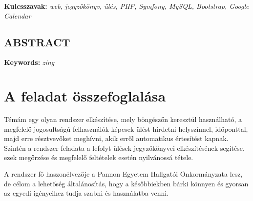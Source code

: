 \documentclass[a4paper,12pt,oneside]{report}
\begin{document}


\vspace{2cm}

{\bf Kulcsszavak:} {\it web, jegyzőkönyv, ülés, PHP, Symfony, MySQL, Bootstrap, Google Calendar }
\newpage

\newpage

\begin{center}
\section*{\textbf{\Large \MakeUppercase{Abstract}}}
\end{center}


\vspace{2cm}

{\bf Keywords:} {\it zing }
\newpage
\listoftodos

\renewcommand{\thefigure}{\arabic{figure}}

\setcounter{tocdepth}{3} %
\thispagestyle{empty}
\tableofcontents
\pagebreak

\setcounter{page}{1} %
\pagestyle{plain}
\fancyhead[C]{\rightmark}
\fancyfoot[R]{\thepage}

\section{A feladat összefoglalása}

Témám egy olyan rendszer elkészítése, mely böngészőn keresztül használható, a megfelelő jogosultságú felhasználók képesek ülést hirdetni helyszínnel, időponttal, majd erre résztvevőket meghívni, akik erről automatikus értesítést kapnak. Szintén a rendszer feladata a lefolyt ülések jegyzőkönyvei elkészítésének segítése, ezek megőrzése és megfelelő feltételek esetén nyilvánossá tétele.

A rendszer fő haszonélvezője a Pannon Egyetem Hallgatói Önkormányzata lesz, de célom a lehetőség általánosítás, hogy a későbbiekben bárki könnyen és gyorsan az egyedi igényeihez tudja szabni és használatba venni.
\end{document}
